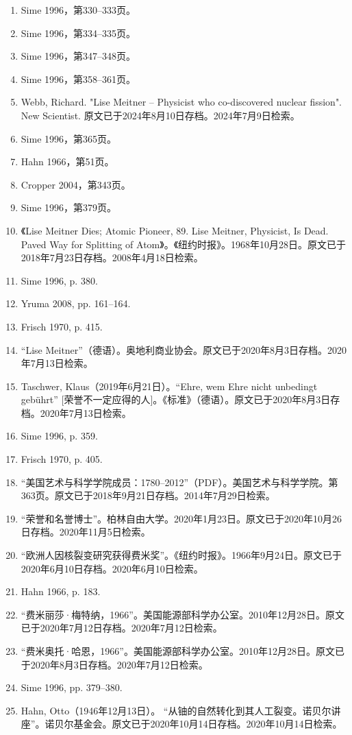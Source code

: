 \begin{enumerate}
\item Sime 1996，第330–333页。
\item Sime 1996，第334–335页。
\item Sime 1996，第347–348页。
\item Sime 1996，第358–361页。
\item Webb, Richard. "Lise Meitner – Physicist who co-discovered nuclear fission". New Scientist. 原文已于2024年8月10日存档。2024年7月9日检索。
\item Sime 1996，第365页。
\item Hahn 1966，第51页。
\item Cropper 2004，第343页。
\item Sime 1996，第379页。
\item 《Lise Meitner Dies; Atomic Pioneer, 89. Lise Meitner, Physicist, Is Dead. Paved Way for Splitting of Atom》。《纽约时报》。1968年10月28日。原文已于2018年7月23日存档。2008年4月18日检索。
\item Sime 1996, p. 380.
\item Yruma 2008, pp. 161–164.
\item Frisch 1970, p. 415.
\item “Lise Meitner”（德语）。奥地利商业协会。原文已于2020年8月3日存档。2020年7月13日检索。
\item Taschwer, Klaus（2019年6月21日）。“Ehre, wem Ehre nicht unbedingt gebührt” [荣誉不一定应得的人]。《标准》（德语）。原文已于2020年8月3日存档。2020年7月13日检索。
\item Sime 1996, p. 359.
\item Frisch 1970, p. 405.
\item “美国艺术与科学学院成员：1780–2012”（PDF）。美国艺术与科学学院。第363页。原文已于2018年9月21日存档。2014年7月29日检索。
\item “荣誉和名誉博士”。柏林自由大学。2020年1月23日。原文已于2020年10月26日存档。2020年11月5日检索。
\item “欧洲人因核裂变研究获得费米奖”。《纽约时报》。1966年9月24日。原文已于2020年6月10日存档。2020年6月10日检索。
\item Hahn 1966, p. 183.
\item “费米丽莎·梅特纳，1966”。美国能源部科学办公室。2010年12月28日。原文已于2020年7月12日存档。2020年7月12日检索。
\item “费米奥托·哈恩，1966”。美国能源部科学办公室。2010年12月28日。原文已于2020年8月3日存档。2020年7月12日检索。
\item Sime 1996, pp. 379–380.
\item Hahn, Otto（1946年12月13日）。 “从铀的自然转化到其人工裂变。诺贝尔讲座”。诺贝尔基金会。原文已于2020年10月14日存档。2020年10月14日检索。

\end{enumerate}
